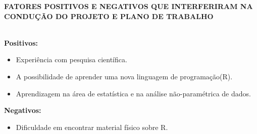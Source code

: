 \documentclass{article}
\begin{document}
\newpage
\begin{center}
\textbf{\large{FATORES POSITIVOS E NEGATIVOS QUE INTERFERIRAM NA CONDUÇÃO DO PROJETO E PLANO DE TRABALHO}}\\
\hrulefill \\
\end{center}
\textbf{Positivos:}
\begin{itemize}
    \item Experiência com pesquisa científica.
    \item A possibilidade de aprender uma nova linguagem de programação(R).
    \item Aprendizagem na área de estatística e na análise não-paramétrica de dados.
\end{itemize}
\textbf{Negativos:}
\begin{itemize}
    \item Dificuldade em encontrar material físico sobre R.
\end{itemize}

\newpage


\end{document}
